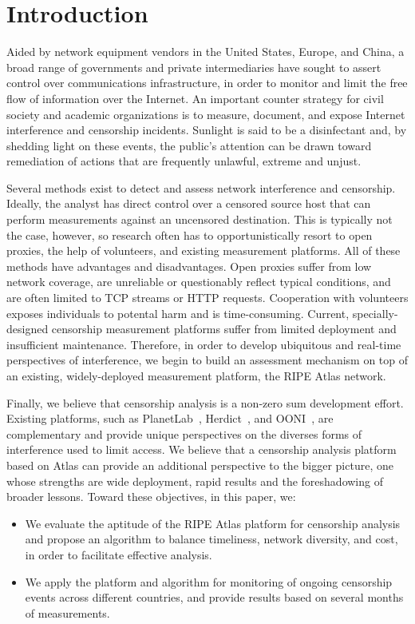 \section{Introduction}
Aided by network equipment vendors in the United States, Europe, and China,
a broad range of governments and private intermediaries have sought to assert control over communications infrastructure, in order to monitor and limit the free flow of information over the Internet.  An important counter strategy for civil society and academic organizations is to measure, document, and expose Internet interference and censorship incidents. Sunlight is said to be a disinfectant and, by shedding light on these events, the public's attention can be drawn toward remediation of actions that are frequently unlawful, extreme and unjust.  

Several methods exist to detect and assess network interference and censorship.  Ideally, the analyst has direct control over a censored source host that can perform measurements against an uncensored destination.  This is typically not the case, however, so research often has to opportunistically resort to open proxies, the help of volunteers, and existing measurement platforms. All of these methods have advantages and disadvantages.  Open proxies suffer from low network coverage, are unreliable or questionably reflect typical conditions, and are often limited to TCP streams or HTTP requests. Cooperation with volunteers exposes individuals to potental harm and is time-consuming. Current, specially-designed censorship measurement platforms suffer from limited deployment and insufficient maintenance. Therefore, in order to develop ubiquitous and real-time perspectives of interference, we begin to build an assessment mechanism on top of an existing, widely-deployed measurement platform, the RIPE Atlas network.

Finally, we believe that censorship analysis is a non-zero sum development effort. Existing platforms, such as PlanetLab~\cite{planetlab}, Herdict~\cite{Herdict}, and OONI~\cite{Filasto2012}, are complementary and provide unique perspectives on the diverses forms of interference used to limit access. We believe that a censorship analysis platform based on Atlas can provide an additional perspective to the bigger picture, one whose strengths are wide deployment, rapid results and the foreshadowing of broader lessons. Toward these objectives, in this paper, we:

\begin{itemize}
	\item We evaluate the aptitude of the RIPE Atlas platform for censorship
		analysis and propose an algorithm to balance timeliness, network
		diversity, and cost, in order to facilitate effective analysis.
	\item We apply the platform and algorithm for monitoring of ongoing
		censorship events across different countries, and provide results based on
		several months of measurements.
\end{itemize}

